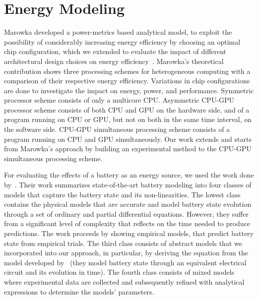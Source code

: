 \section{\color{cyan}Energy Modeling}
\label{sec:soa-ene-mod}


Marowka developed a power-metrics based analytical model, to exploit the possibility of considerably increasing energy efficiency by choosing an optimal chip configuration, which we extended to evaluate the impact of different architectural design choices on energy efficiency~\citep{marowka2017energy}. Marowka's theoretical contribution shows three processing schemes for heterogeneous computing with a comparison of their respective energy efficiency. Variations in chip configurations are done to investigate the impact on energy, power, and performance. Symmetric processor scheme consists of only a multicore CPU. Asymmetric CPU-GPU processor scheme consists of both CPU and GPU on the hardware side, and of a program running on CPU or GPU, but not on both in the same time interval, on the software side. CPU-GPU simultaneous processing scheme consists of a program running on CPU and GPU simultaneously. Our work extends and starts from Marowka's approach by building an experimental method to the CPU-GPU simultaneous processing scheme.

For evaluating the effects of a battery as an energy source, we used the work done by~\citep{rao2003battery}. Their work summarizes state-of-the-art battery modeling into four classes of models that capture the battery state and its non-linearities. The lowest class contains the physical models that are accurate and model battery state evolution through a set of ordinary and partial differential equations. However, they suffer from a significant level of complexity that reflects on the time needed to produce predictions. The work proceeds by showing empirical models, that predict battery state from empirical trials. The third class consists of abstract models that we incorporated into our approach, in particular, by deriving the equation from the model developed by~\citep{hasan2018exogenous} (they model battery state through an equivalent electrical circuit and its evolution in time). The fourth class consists of mixed models where experimental data are collected and subsequently refined with analytical expressions to determine the models' parameters.

